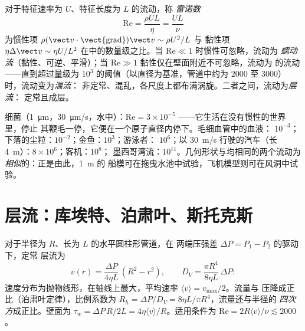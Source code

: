\begin{definition}[雷诺数]\label{def:b2:viscous-flows:reynolds}
对于特征速率为 $U$、特征长度为 $L$ 的流动，称
\emph{雷诺数}
\[
\mathrm{Re} = \frac{\rho UL}{\eta} = \frac{UL}{\nu}
\]
为惯性项
$\rho(\vect v\cdot\operatorname{\vect{grad}})\vect v \sim \rho U^2/L$ 与
黏性项 $\eta\Delta\vect v \sim \eta U/L^2$ 在中的数量级之比。当 $\mathrm{Re} \ll 1$ 时惯性可忽略，流动为
\emph{蠕动流}（黏性、可逆、平滑）；当 $\mathrm{Re} \gg 1$
黏性仅在壁面附近不可忽略，流动为
的流动——直到超过量级为 $10^3$ 的阈值（以直径为基准，管道中约为 $2000$
至 $3000$）时，流动变为\emph{湍流}：
非定常、混乱，各尺度上都布满涡旋。二者之间，流动为\emph{层流}：
定常且成层。
\end{definition}

\begin{example}[雷诺数的日常例子]\label{ex:b2:viscous-flows:revalues}
细菌（\qty{1}{\micro m}，\qty{30}{\micro m/s}，水中）：$\mathrm{Re} =
3 \times 10^{-5}$ ——它生活在没有惯性的世界里，停止
其鞭毛一停，它便在一个原子直径内停下。毛细血管中的血液：
$10^{-3}$；下落的尘粒：$10^{-2}$；金鱼：$10^3$；游泳者：
$10^6$；以 \qty{30}{m/s} 行驶的汽车（长 \qty{4}{m}）：$8 \times 10^6$；客机：$10^8$；
墨西哥湾流：$10^{11}$。几何形状与均相同的两个流动为
\emph{相似}的：正是由此，\qty{1}{m} 的
船模可在拖曳水池中试验，飞机模型则可在风洞中试验。
\end{example}

\section{层流：库埃特、泊肃叶、斯托克斯}

\begin{proposition}[管道中的泊肃叶流动]\label{prop:b2:viscous-flows:poiseuille}
对于半径为 $R$、长为 $L$ 的水平圆柱形管道，在
两端压强差 $\Delta P = P_1 - P_2$ 的驱动下，定常
层流为
\[
v(r) = \frac{\Delta P}{4\eta L}\,(R^2 - r^2) , \qquad
D_V = \frac{\pi R^4}{8\eta L}\,\Delta P :
\]
速度分布为抛物线形，在轴线上最大，平均速率
$\langle v\rangle = v_{\max}/2$。流量与
压降成正比（泊肃叶定律），比例系数为\emph{}
$R_h = \Delta P/D_V = 8\eta L/\pi R^4$，流量还与半径的
\emph{四次方}成正比。壁面为 $\tau_w = \Delta P\,R/2L = 4\eta\langle v
\rangle/R$。适用条件为 $\mathrm{Re} = 2R\langle v\rangle/\nu \lesssim 2000$。
\end{proposition}

